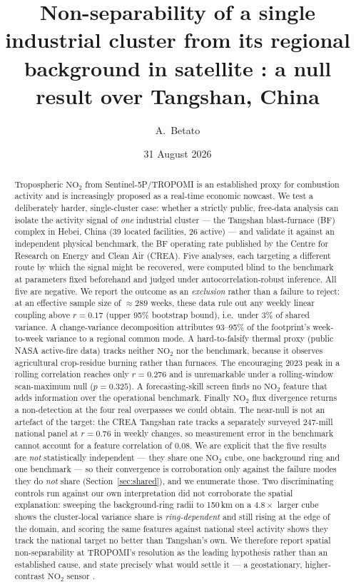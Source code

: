 \documentclass[11pt,a4paper]{article}
\title{\bfseries Non-separability of a single industrial cluster from its regional
background in satellite \ce{NO_2}: a null result over Tangshan, China}
\author[1]{A.~Betato}
\affil[1]{Independent researcher --- \texttt{abetatos@gmail.com}}
\date{31 August 2026}
\newcommand{\rval}[1]{\mbox{$r=#1$}}
\providecommand{\ce}[1]{\ensuremath{\mathrm{#1}}}
\begin{document}
\maketitle

\begin{abstract}
\noindent
Tropospheric \ce{NO_2} from Sentinel-5P/TROPOMI is an established proxy for combustion activity
and is increasingly proposed as a real-time economic nowcast. We test a deliberately harder,
single-cluster case: whether a strictly public, free-data analysis can isolate the activity signal
of \emph{one} industrial cluster --- the Tangshan blast-furnace (BF) complex in Hebei, China (39
located facilities, 26 active) --- and validate it against an independent physical benchmark, the
BF operating rate published by the Centre for Research on Energy and Clean Air (CREA). Five
analyses, each targeting a different route by which the signal might be recovered, were computed
blind to the benchmark at parameters fixed beforehand and judged under autocorrelation-robust
inference. All five are negative. We report the outcome as an \emph{exclusion} rather than a
failure to reject: at an effective sample size of $\approx289$ weeks, these data rule out any
weekly linear coupling above \rval{0.17} (upper 95\% bootstrap bound), i.e.\ under 3\% of shared
variance. A change-variance decomposition attributes 93--95\% of the footprint's week-to-week
variance to a regional common mode. A hard-to-falsify thermal proxy (public NASA active-fire data)
tracks neither \ce{NO_2} nor the benchmark, because it observes agricultural crop-residue burning
rather than furnaces. The encouraging 2023 peak in a rolling correlation reaches only \rval{0.276}
and is unremarkable under a rolling-window scan-maximum null ($p=0.325$). A forecasting-skill
screen finds no \ce{NO_2} feature that adds information over the operational benchmark. Finally
\ce{NO_2} flux divergence \citep{beirle_2021,beirle_2023} returns a non-detection at the four real
overpasses we could obtain. The near-null is not an artefact of the target: the CREA Tangshan rate
tracks a separately surveyed 247-mill national panel at \rval{0.76} in weekly changes, so
measurement error in the benchmark cannot account for a feature correlation of $0.08$. We are
explicit that the five results are \emph{not} statistically independent --- they share one
\ce{NO_2} cube, one background ring and one benchmark --- so their convergence is corroboration
only against the failure modes they do \emph{not} share (Section~\ref{sec:shared}), and we
enumerate those. Two discriminating controls run against our own interpretation did not
corroborate the spatial explanation: sweeping the background-ring radii to 150\,km on a
$4.8\times$ larger cube shows the cluster-local variance share is \emph{ring-dependent} and still
rising at the edge of the domain, and scoring the same features against national steel activity
shows they track the national target no better than Tangshan's own. We therefore report spatial
non-separability at TROPOMI's resolution as the leading hypothesis rather than an established
cause, and state precisely what would settle it --- a geostationary, higher-contrast \ce{NO_2}
sensor \citep{kim_2020_gems,park_2025_gems_gan}.


\end{abstract}
\end{document}

